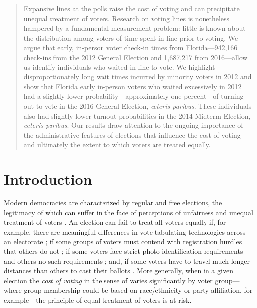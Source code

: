 \documentclass[12pt,titlepage]{article}
\begin{document}


\begin{abstract}
  \noindent 
  Expansive lines at the polls raise the cost of voting and can
  precipitate unequal treatment of voters. Research on voting lines is
  nonetheless hampered by a fundamental measurement problem: little is
  known about the distribution among voters of time spent in line
  prior to voting. We
  argue that early, in-person voter check-in times from
  Florida---942,166
  check-ins from the 2012 General Election and 1,687,217 from
  2016---allow us identify individuals who waited in line to vote.  We
  highlight disproportionately long wait times incurred by minority
  voters in 2012 and show that Florida early in-person voters who
  waited excessively in 2012 had a slightly lower
  probability---approximately one percent---of turning out to vote in
  the 2016 General Election, \emph{ceteris paribus}.  These
  individuals also had slightly lower turnout probabilities in the
  2014 Midterm Election, \emph{ceteris paribus}.  Our results draw
  attention to the ongoing importance of the administrative features
  of elections that influence the cost of voting and ultimately the
  extent to which voters are treated equally.
\end{abstract}



\newpage
\section*{Introduction}

Modern democracies are characterized by regular and free elections,
the legitimacy of which can suffer in the face of perceptions of
unfairness and unequal treatment of voters
\citep{norris2014electoral}. An election can fail to treat all voters
equally if, for example, there are meaningful differences in vote
tabulating technologies across an electorate
\citep{kimballkropf:tech}; if some groups of voters must contend with
registration hurdles that others do not
\citep{ansolhersh:registration}; if some voters face strict photo
identification requirements and others no such requirements
\citep{benteleetal:newjimcrow}; and, if some voters have to travel
much longer distances than others to cast their ballots
\citep{dyckgimpel:distance}. More generally, when in a given election
the \emph{cost of voting} in the sense of \cite{downs:econtheory}
varies significantly by voter group---where group membership could be
based on race/ethnicity or party affiliation, for example---the
principle of equal treatment of voters is at risk.
\end{document}
